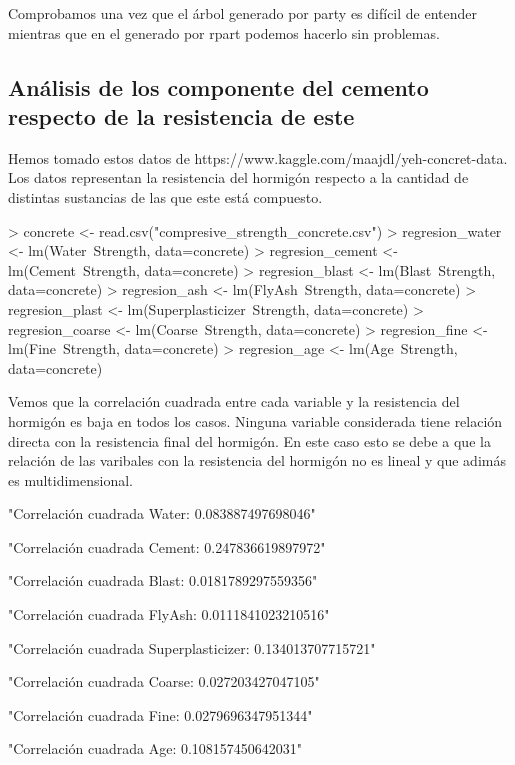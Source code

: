 \documentclass [a4paper] {article}
\begin{document}
Comprobamos una vez que el árbol generado por party es difícil de entender mientras que en el generado por rpart podemos hacerlo sin problemas.

\subsection{Análisis de los componente del cemento respecto de la resistencia de este}
Hemos tomado estos datos de https://www.kaggle.com/maajdl/yeh-concret-data.
Los datos representan la resistencia del hormigón respecto a la cantidad de distintas sustancias de las que este está compuesto.
\begin{Schunk}
\begin{Sinput}
> concrete <- read.csv("compresive_strength_concrete.csv")
> regresion_water <- lm(Water~Strength, data=concrete)
> regresion_cement <- lm(Cement~Strength, data=concrete)
> regresion_blast <- lm(Blast~Strength, data=concrete)
> regresion_ash <- lm(FlyAsh~Strength, data=concrete)
> regresion_plast <- lm(Superplasticizer~Strength, data=concrete)
> regresion_coarse <- lm(Coarse~Strength, data=concrete)
> regresion_fine <- lm(Fine~Strength, data=concrete)
> regresion_age <- lm(Age~Strength, data=concrete)
\end{Sinput}
\end{Schunk}
Vemos que la correlación cuadrada entre cada variable y la resistencia del hormigón es baja en todos los casos.
Ninguna variable considerada tiene relación directa con la resistencia final del hormigón.
En este caso esto se debe a que la relación de las varibales con la resistencia del hormigón no es lineal y que adimás es multidimensional.
\begin{Schunk}
\begin{Soutput}
[1] "Correlación cuadrada Water: 0.083887497698046"
\end{Soutput}
\begin{Soutput}
[1] "Correlación cuadrada Cement: 0.247836619897972"
\end{Soutput}
\begin{Soutput}
[1] "Correlación cuadrada Blast: 0.0181789297559356"
\end{Soutput}
\begin{Soutput}
[1] "Correlación cuadrada FlyAsh: 0.0111841023210516"
\end{Soutput}
\begin{Soutput}
[1] "Correlación cuadrada Superplasticizer: 0.134013707715721"
\end{Soutput}
\begin{Soutput}
[1] "Correlación cuadrada Coarse: 0.027203427047105"
\end{Soutput}
\begin{Soutput}
[1] "Correlación cuadrada Fine: 0.0279696347951344"
\end{Soutput}
\begin{Soutput}
[1] "Correlación cuadrada Age: 0.108157450642031"
\end{Soutput}
\end{Schunk}
\end{document}

